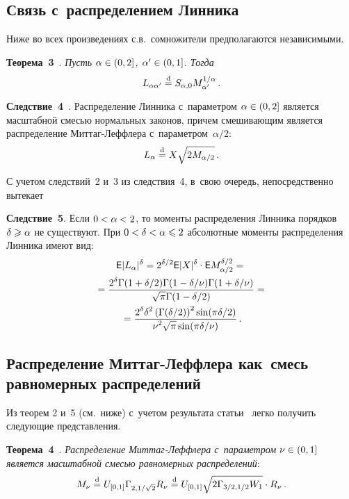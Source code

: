 \begin{multicols}{2}
\subsection{Связь с~распределением Линника}

Ниже во всех произведениях с.в.\ сомножители предполагаются
независимыми.

\bigskip

\noindent
\textbf{Теорема~3}~\cite{KorolevZeifman2017}. \textit{Пусть
$\alpha\hm\in(0,2]$, $\alpha'\hm\in(0,1]$. Тогда}
$$
L_{\alpha\alpha'}\stackrel{\mathrm{d}}{=} S_{\alpha,0}M_{\alpha'}^{1/\alpha}\,.
$$

\bigskip

\noindent
\textbf{Следствие~4}~\cite{KorolevZeifman2017}. {Распределение
Линника с~параметром $\alpha\hm\in(0,2]$ является масштабной смесью
нормальных законов, причем смешивающим является распределение
Мит\-таг-Леф\-фле\-ра с~па\-ра\-мет\-ром~$\alpha/2$}:
$$
L_{\alpha}\stackrel{\mathrm{d}}{=} X\sqrt{2M_{\alpha/2}}\,.
$$

\smallskip

С учетом следствий~2 и~3 из следствия~4, в~свою очередь,
непосредственно вытекает

\bigskip

\noindent
\textbf{Следствие~5}. Если $0\hm<\alpha\hm<2$, то моменты распределения
Линника порядков $\delta\hm\geqslant\alpha$ не существуют. При
$0\hm<\delta\hm<\alpha\hm\leqslant2$ абсолютные моменты распределения Линника имеют
вид:
\begin{multline*}
{\sf E}|L_{\alpha}|^{\delta}=2^{\delta/2}{\sf E}|X|^{\delta}\cdot
{\sf E}M_{\alpha/2}^{\delta/2}={}\\
{}=\displaystyle\frac{\displaystyle 2^{\delta}\Gamma(1+\delta/2)
\Gamma(1-\delta/\nu)\Gamma(1+\delta/\nu)\mathstrut}{\displaystyle \sqrt{\pi}\Gamma(1-\delta/2)\mathstrut}={}\\
{}=
\displaystyle\frac{\displaystyle 2^{\delta}\delta^2\left(\Gamma({\delta}/{2})\right)^2\sin
({\pi\delta}/{2})\mathstrut}{\displaystyle \nu^2\sqrt{\pi}\sin({\pi\delta}/{\nu})\mathstrut}\,.
\end{multline*}

\subsection{Распределение Миттаг-Леффлера как~смесь равномерных распределений}

Из теорем 2 и~5 (см.\ ниже) с~учетом результата статьи~\cite{Walker1999} 
легко получить следующие представления.

\smallskip

\noindent
\textbf{Теорема~4}~\cite{Korolev2016TVP}. \textit{Распределение
Мит\-таг-Леф\-фле\-ра с~параметром $\nu\hm\in(0,1]$ является масштабной
смесью равномерных распределений}:
$$
M_{\nu}\stackrel{\mathrm{d}}{=} U_{[0,1]}\Gamma_{2,1/\sqrt{2}} R_{\nu} \stackrel{\mathrm{d}}{=}
U_{[0,1]}\sqrt{2\Gamma_{3/2,1/2}W_1}\cdot R_{\nu}\,.
$$


\end{multicols}
